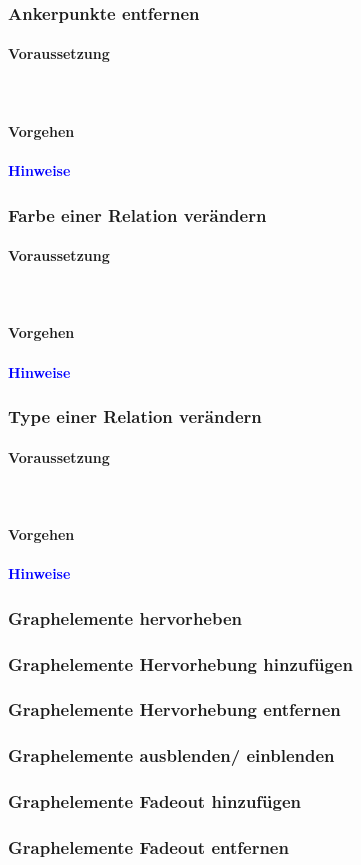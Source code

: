 \documentclass[enabledeprecatedfontcommands,fontsize=11pt,paper=a4,twoside]{scrartcl}
\newcommand*{\hint}{\paragraph{\textcolor{blue}{Hinweise}}}
\newcommand*{\condition}{\paragraph{Voraussetzung}$\;$ \vspace{0.2cm}\\}
\newcommand*{\action}{\paragraph{Vorgehen}}
\begin{document}
		\subsubsection{Ankerpunkte entfernen}
		\condition
		\action
		\hint
		
		\subsubsection{Farbe einer Relation verändern}
		\condition
		\action
		\hint
		
		\subsubsection{Type einer Relation verändern}
		\condition
		\action
		\hint
		
		\newpage
		\subsubsection{Graphelemente hervorheben}
		\subsubsection{Graphelemente Hervorhebung hinzufügen}
		\subsubsection{Graphelemente Hervorhebung entfernen}
		
		\subsubsection{Graphelemente ausblenden/ einblenden}
		\subsubsection{Graphelemente Fadeout hinzufügen}
		\subsubsection{Graphelemente Fadeout entfernen}
		
\end{document}
